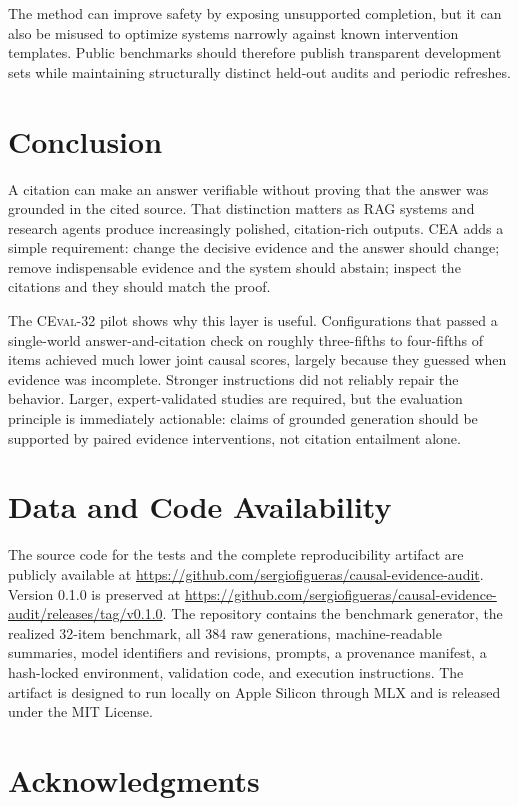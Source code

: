 \documentclass[10pt,twocolumn]{article}
\newcommand{\method}{\textsc{CEA}}
\newcommand{\dataset}{\textsc{CEval-32}}
\begin{document}
The method can improve safety by exposing unsupported completion, but it can also be misused to optimize systems narrowly against known intervention templates. Public benchmarks should therefore publish transparent development sets while maintaining structurally distinct held-out audits and periodic refreshes.

\section{Conclusion}

A citation can make an answer verifiable without proving that the answer was grounded in the cited source. That distinction matters as RAG systems and research agents produce increasingly polished, citation-rich outputs. \method{} adds a simple requirement: change the decisive evidence and the answer should change; remove indispensable evidence and the system should abstain; inspect the citations and they should match the proof.

The \dataset{} pilot shows why this layer is useful. Configurations that passed a single-world answer-and-citation check on roughly three-fifths to four-fifths of items achieved much lower joint causal scores, largely because they guessed when evidence was incomplete. Stronger instructions did not reliably repair the behavior. Larger, expert-validated studies are required, but the evaluation principle is immediately actionable: claims of grounded generation should be supported by paired evidence interventions, not citation entailment alone.

\section*{Data and Code Availability}

The source code for the tests and the complete reproducibility artifact are publicly available at \url{https://github.com/sergiofigueras/causal-evidence-audit}. Version 0.1.0 is preserved at \url{https://github.com/sergiofigueras/causal-evidence-audit/releases/tag/v0.1.0}. The repository contains the benchmark generator, the realized 32-item benchmark, all 384 raw generations, machine-readable summaries, model identifiers and revisions, prompts, a provenance manifest, a hash-locked environment, validation code, and execution instructions. The artifact is designed to run locally on Apple Silicon through MLX and is released under the MIT License.

\section*{Acknowledgments}
\end{document}
